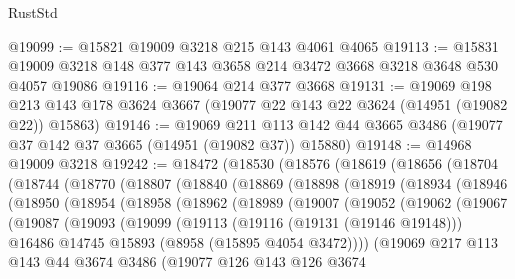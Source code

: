 \begin{lexlean}{RustStd}
\begin{coremodule}
@19099 := @15821 @19009 @3218 @215 @143 @4061 @4065
@19113 := @15831 @19009 @3218 @148 @377 @143 @3658 @214 @3472 @3668 @3218 @3648 @530 @4057 @19086
@19116 := @19064 @214 @377 @3668
@19131 := @19069
    @198
    @213
    @143
    @178
    @3624
    @3667
    (@19077 @22 @143 @22 @3624 (@14951 (@19082 @22)) @15863)
@19146 := @19069
    @211
    @113
    @142
    @44
    @3665
    @3486
    (@19077 @37 @142 @37 @3665 (@14951 (@19082 @37)) @15880)
@19148 := @14968 @19009 @3218
@19242 := @18472
    (@18530
      (@18576
        (@18619
          (@18656
            (@18704
              (@18744
                (@18770
                  (@18807
                    (@18840
                      (@18869
                        (@18898
                          (@18919
                            (@18934
                              (@18946
                                (@18950
                                  (@18954
                                    (@18958
                                      (@18962
                                        (@18989
                                          (@19007
                                            (@19052
                                              (@19062
                                                (@19067
                                                  (@19087
                                                    (@19093
                                                      (@19099
                                                        (@19113
                                                          (@19116 (@19131 (@19146 @19148)))
                                                          @16486
                                                          @14745
                                                          @15893
                                                          (@8958 (@15895 @4054 @3472))))
                                                      (@19069
                                                        @217
                                                        @113
                                                        @143
                                                        @44
                                                        @3674
                                                        @3486
                                                        (@19077
                                                          @126
                                                          @143
                                                          @126
                                                          @3674

\end{coremodule}
\end{lexlean}
